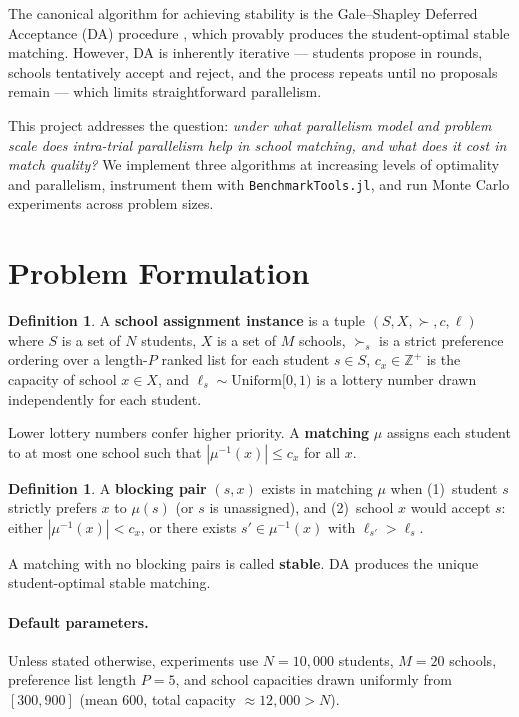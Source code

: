 \documentclass{article}
\theoremstyle{plain}
\theoremstyle{definition}
\newtheorem{definition}[theorem]{Definition}
\theoremstyle{remark}
\begin{document}
The canonical algorithm for achieving stability is the Gale--Shapley
Deferred Acceptance (DA) procedure \cite{gale1962college}, which provably
produces the student-optimal stable matching. However, DA is inherently
iterative --- students propose in rounds, schools tentatively accept and
reject, and the process repeats until no proposals remain --- which
limits straightforward parallelism.

This project addresses the question: \emph{under what parallelism model and
problem scale does intra-trial parallelism help in school matching, and what
does it cost in match quality?} We implement three algorithms at increasing
levels of optimality and parallelism, instrument them with
\texttt{BenchmarkTools.jl}, and run Monte Carlo experiments across problem
sizes.

\section{Problem Formulation}
\label{sec:problem}

\begin{definition}
A \textbf{school assignment instance} is a tuple
$(S, X, \succ, c, \ell)$ where $S$ is a set of $N$ students, $X$ is a set
of $M$ schools, $\succ_s$ is a strict preference ordering over a length-$P$
ranked list for each student $s \in S$, $c_x \in \mathbb{Z}^+$ is the
capacity of school $x \in X$, and $\ell_s \sim \mathrm{Uniform}[0,1)$ is a
lottery number drawn independently for each student.
\end{definition}

Lower lottery numbers confer higher priority. A \textbf{matching} $\mu$
assigns each student to at most one school such that $|\mu^{-1}(x)| \le c_x$
for all $x$.

\begin{definition}
A \textbf{blocking pair} $( s, x )$ exists in matching $\mu$ when
(1)~student $s$ strictly prefers $x$ to $\mu(s)$ (or $s$ is unassigned), and
(2)~school $x$ would accept $s$: either $|\mu^{-1}(x)| < c_x$, or there
exists $s' \in \mu^{-1}(x)$ with $\ell_{s'} > \ell_s$.
\end{definition}

A matching with no blocking pairs is called \textbf{stable}. DA produces the
unique student-optimal stable matching.

\paragraph{Default parameters.}
Unless stated otherwise, experiments use $N = 10{,}000$ students,
$M = 20$ schools, preference list length $P = 5$, and school capacities
drawn uniformly from $[300, 900]$ (mean $600$, total capacity
$\approx 12{,}000 > N$).
\end{document}
